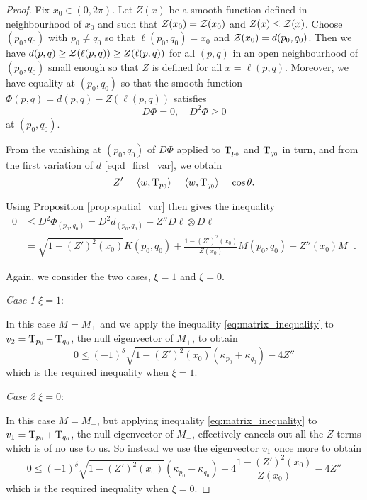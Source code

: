 \documentclass[a4paper, 12pt]{amsart}
\begin{document}
\begin{proof}
Fix $x_0 \in (0,2\pi)$. Let $Z(x)$ be a smooth function defined in neighbourhood of $x_0$ and such that $Z(x_0) = \operatorname{\mathcal{Z}}(x_0)$ and $Z(x) \leq \operatorname{\mathcal{Z}}(x)$. Choose $(p_0,q_0)$ with $p_0\ne q_0$ so that $\ell(p_0, q_0) = x_0$ and $\operatorname{\mathcal{Z}}(x_0) = d(p_0, q_0)$.  Then we have $d(p, q) \geq \operatorname{\mathcal{Z}}(\ell(p, q)) \geq Z(\ell(p, q))$ for all $(p,q)$ in an open neighbourhood of $(p_0,q_0)$ small enough so that $Z$ is defined for all $x=\ell(p,q)$. Moreover, we have equality at $(p_0, q_0)$ so that the smooth function $\Phi(p, q) = d(p,q) - Z(\ell(p, q))$ satisfies
\[
D \Phi = 0, \quad D^2\Phi \geq 0
\]
at $(p_0, q_0)$.

From the vanishing at $(p_0,q_0)$ of $D\Phi$ applied to $\operatorname{T}_{p_0}$ and $\operatorname{T}_{q_0}$ in turn, and from the first variation of $d$ \eqref{eq:d_first_var}, we obtain
\begin{equation}
\label{eq:vanishing_first_var}
Z' = \left\langle w,\operatorname{T}_{p_0} \right\rangle = \left\langle w,\operatorname{T}_{q_0} \right\rangle = \cos\theta.
\end{equation}

Using Proposition \ref{prop:spatial_var} then gives the inequality
\begin{equation}
\label{eq:matrix_inequality}
\begin{split}
0 &\leq D^2\Phi_{(p_0,q_0)} = D^2 d_{(p_0,q_0)} - Z'' D\ell\otimes D\ell \\
&= \sqrt{1 - (Z')^2(x_0)} K(p_0,q_0) + \frac{1-(Z')^2(x_0)}{Z(x_0)} M (p_0,q_0) - Z''(x_0) M_-.
\end{split}
\end{equation}

Again, we consider the two cases, $\xi=1$ and $\xi=0$.

\emph{Case 1} $\xi=1$:

In this case $M=M_+$ and we apply the inequality \eqref{eq:matrix_inequality} to $v_2 = \operatorname{T}_{p_0} - \operatorname{T}_{q_0}$, the null eigenvector of $M_+$, to obtain
\[
0 \leq (-1)^{\delta} \sqrt{1 - (Z')^2(x_0)} (\kappa_{p_0} + \kappa_{q_0}) - 4Z''
\]
which is the required inequality when $\xi=1$.

\emph{Case 2} $\xi=0$:

In this case $M=M_-$, but applying inequality \eqref{eq:matrix_inequality} to $v_1 = \operatorname{T}_{p_0} + \operatorname{T}_{q_0}$, the null eigenvector of $M_-$, effectively cancels out all the $Z$ terms which is of no use to us. So instead we use the eigenvector $v_1$ once more to obtain
\[
0 \leq (-1)^{\delta} \sqrt{1 - (Z')^2(x_0)} (\kappa_{p_0} - \kappa_{q_0}) + 4\frac{1-(Z')^2(x_0)}{Z(x_0)} -4Z''
\]
which is the required inequality when $\xi=0$.
\end{proof}
\end{document}
